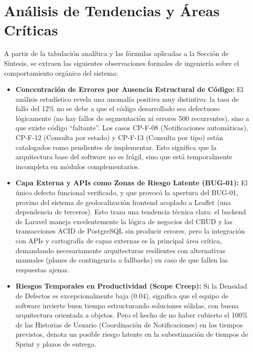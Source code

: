 \section{Análisis de Tendencias y Áreas Críticas}
\label{sec:analisis_tendencias}

A partir de la tabulación analítica y las fórmulas aplicadas a la Sección de Síntesis, se extraen las siguientes observaciones formales de ingeniería sobre el comportamiento orgánico del sistema:

\begin{itemize}
    \item \textbf{Concentración de Errores por Ausencia Estructural de Código:}
    El análisis estadístico revela una anomalía positiva muy distintiva: la tasa de fallo del 12\% no se debe a que el código desarrollado sea defectuoso lógicamente (no hay fallos de segmentación ni errores 500 recurrentes), sino a que existe código ``faltante''. Los casos CP-F-08 (Notificaciones automáticas), CP-F-12 (Consulta por estado) y CP-F-13 (Consulta por tipo) están catalogados como pendientes de implementar. Esto significa que la arquitectura base del software no es frágil, sino que está temporalmente incompleta en módulos complementarios.
    
    \item \textbf{Capa Externa y APIs como Zonas de Riesgo Latente (BUG-01):}
    El único defecto funcional verificado, y que provocó la apertura del BUG-01, provino del sistema de geolocalización frontend acoplado a Leaflet (una dependencia de terceros). Esto traza una tendencia técnica clara: el backend de Laravel maneja excelentemente la lógica de negocios del CRUD y las transacciones ACID de PostgreSQL sin producir errores, pero la integración con APIs y cartografía de capas externas es la principal área crítica, demandando necesariamente arquitecturas resilientes con alternativas manuales (planes de contingencia o fallbacks) en caso de que fallen las respuestas ajenas.
    
    \item \textbf{Riesgos Temporales en Productividad (Scope Creep):}
    Si la Densidad de Defectos es excepcionalmente baja ($0.04$), significa que el equipo de software invierte buen tiempo estructurando soluciones sólidas, con buena arquitectura orientada a objetos. Pero el hecho de no haber cubierto el 100\% de las Historias de Usuario (Coordinación de Notificaciones) en los tiempos previstos, denota un posible riesgo latente en la subestimación de tiempos de Sprint y plazos de entrega.
\end{itemize}
